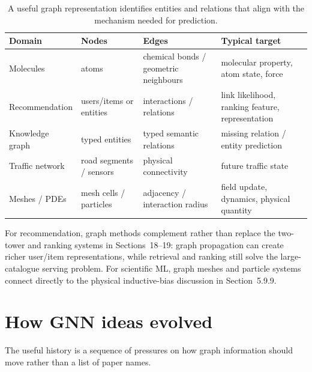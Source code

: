 \begin{table}[htbp]
\centering
\small
\begin{tabular}{p{}p{}p{}p{}}
\toprule
Domain & Nodes & Edges & Typical target \\
\midrule
Molecules & atoms & chemical bonds / geometric neighbours & molecular property, atom state, force \\
Recommendation & users/items or entities & interactions / relations & link likelihood, ranking feature, representation \\
Knowledge graph & typed entities & typed semantic relations & missing relation / entity prediction \\
Traffic network & road segments / sensors & physical connectivity & future traffic state \\
Meshes / PDEs & mesh cells / particles & adjacency / interaction radius & field update, dynamics, physical quantity \\
\bottomrule
\end{tabular}
\caption{A useful graph representation identifies entities and relations that align with the mechanism needed for prediction.}
\label{tab:gnn-applications}
\end{table}

For recommendation, graph methods complement rather than replace the two-tower and ranking systems in Sections~18--19: graph propagation can create richer user/item representations, while retrieval and ranking still solve the large-catalogue serving problem.
For scientific ML, graph meshes and particle systems connect directly to the physical inductive-bias discussion in Section~5.9.9.

\section{How GNN ideas evolved}
The useful history is a sequence of pressures on how graph information should move rather than a list of paper names.


